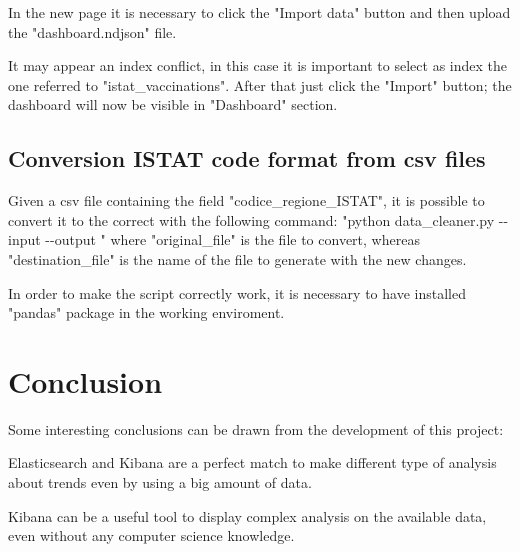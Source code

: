 \documentclass{article}
\begin{document}
In the new page it is necessary to click the {\selectfont"Import data"} button and then upload the {\selectfont"dashboard.ndjson"} file.

It may appear an index conflict, in this case it is important to select as index the one referred to {\selectfont"istat\_vaccinations"}.
After that just click the {\selectfont"Import"} button; the dashboard will now be visible in {\selectfont"Dashboard"} section.

\subsection{Conversion ISTAT code format from csv files}
Given a csv file containing the field {\selectfont"codice\_regione\_ISTAT"},
it is possible to convert it to the correct with the following command:
\hfill \break
{\selectfont"python data\_cleaner.py -{}-input {\color{magenta}{original\_file}} -{}-output {\color{magenta}{destination\_file}}" }
\hfill \break
where {\selectfont"original\_file"} is the file to convert, whereas {\selectfont"destination\_file"} is the name of the file to generate with the new changes.

In order to make the script correctly work, it is necessary to have installed {\selectfont"pandas"} package in the working enviroment.

\newpage

\section{Conclusion}

Some interesting conclusions can be drawn from the development of this project:

Elasticsearch and Kibana are a perfect match to make different type of analysis about trends even by using a big amount of data.

Kibana can be a useful tool to display complex analysis on the available data, even without any computer science knowledge.
\end{document}
